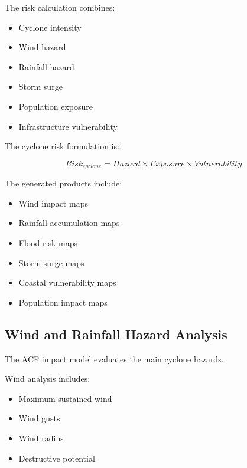 The risk calculation combines:

\begin{itemize}

\item Cyclone intensity

\item Wind hazard

\item Rainfall hazard

\item Storm surge

\item Population exposure

\item Infrastructure vulnerability

\end{itemize}


The cyclone risk formulation is:

\[
Risk_{cyclone}
=
Hazard
\times
Exposure
\times
Vulnerability
\]


The generated products include:

\begin{itemize}

\item Wind impact maps

\item Rainfall accumulation maps

\item Flood risk maps

\item Storm surge maps

\item Coastal vulnerability maps

\item Population impact maps

\end{itemize}



\subsection{Wind and Rainfall Hazard Analysis}

The ACF impact model evaluates the main cyclone hazards.

Wind analysis includes:

\begin{itemize}

\item Maximum sustained wind

\item Wind gusts

\item Wind radius

\item Destructive potential

\end{itemize}


